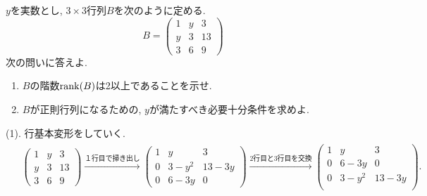 \documentclass[dvipdfmx,a4paper,11pt]{article}
\theoremstyle{definition}
\begin{document}
$y$を実数とし, $3 \times 3$行列$B$を次のように定める.
 $$B=
  \begin{pmatrix}
1 &y&3 \\
y & 3& 13\\
3&6 &9
 \end{pmatrix}
 $$
次の問いに答えよ.
     \vspace{11pt}
     
  \begin{enumerate}
\renewcommand{\labelenumi}{(\arabic{enumi}).}
 \setlength{\parskip}{0cm} %
  \setlength{\itemsep}{0cm}
\item $B$の階数$\rank (B)$は2以上であることを示せ.
 


\item $B$が正則行列になるための, $y$が満たすべき必要十分条件を求めよ.
 \end{enumerate}

\newpage
 
\hspace{-11pt}{\Large $\bullet$ 第3問解答例.}

(1). 行基本変形をしていく.
\begin{align*}
\begin{split}
 & \begin{pmatrix}
1 &y&3 \\
y & 3& 13\\
3&6 &9
 \end{pmatrix}
  \overset{\text{１行目で掃き出し}}{\longrightarrow} 
 \begin{pmatrix}
1 &y&3 \\
0 & 3 - y^2& 13 - 3y\\
0&6 - 3y &0 
 \end{pmatrix} 
  \overset{\text{2行目と3行目を交換}}{\longrightarrow} 
 \begin{pmatrix}
1 &y&3 \\
0&6 - 3y &0 \\
0 & 3 - y^2& 13 - 3y\\
 \end{pmatrix}.
 \end{split}
\end{align*}
\end{document}

